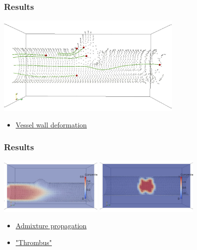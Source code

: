 \documentclass[14pt]{beamer}
\begin{document}
\begin{frame}
\frametitle{Results}
    \begin{center}
        \includegraphics[width=9cm]{cylinder2_avi.png}
    \end{center}

\begin{itemize}
    \item[\MVRightarrow] \href{run:video/cylinder2.avi}{Vessel wall deformation}
\end{itemize}
\end{frame}

\begin{frame}
\frametitle{Results}
    \begin{center}
        \includegraphics[width=5cm]{source_in_vessel_avi.png}
        \vspace{0.40mm}
        \includegraphics[width=5cm]{thrombus_in_vessel_avi.png}
    \end{center}

\begin{itemize}
    \item[\MVRightarrow] \href{run:video/source_in_vessel.avi}{Admixture propagation}
    \item[\MVRightarrow] \href{run:video/thrombus_in_vessel.avi}{"Thrombus"}
\end{itemize}
\end{frame}
\end{document}
